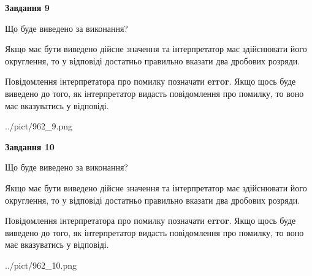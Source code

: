 \documentclass[12pt, ukrainian]{article}
\begin{document}
{\begin {Large}
{\begin {center}\textbf{Завдання 9}\end {center}}\par
Що буде виведено за виконання? \par

Якщо має бути виведено дійсне значення та інтерпретатор має здійснювати його округлення, 
то у відповіді достатньо правильно вказати два дробових розряди.

Повідомлення інтерпретатора про помилку позначати \textbf{error}.
Якщо щось буде виведено до того, як інтерпретатор видасть повідомлення про помилку, 
то воно має вказуватись у відповіді. \par

\begin{center}
	{../pict/962_9.png}
\end{center}
\newpage

{\begin {center}\textbf{Завдання 10}\end {center}}\par
Що буде виведено за виконання? \par

Якщо має бути виведено дійсне значення та інтерпретатор має здійснювати його округлення, 
то у відповіді достатньо правильно вказати два дробових розряди.

Повідомлення інтерпретатора про помилку позначати \textbf{error}.
Якщо щось буде виведено до того, як інтерпретатор видасть повідомлення про помилку, 
то воно має вказуватись у відповіді. \par

\begin{center}
	{../pict/962_10.png}
\end{center}
\newpage

\end {Large}}
\end{document}
